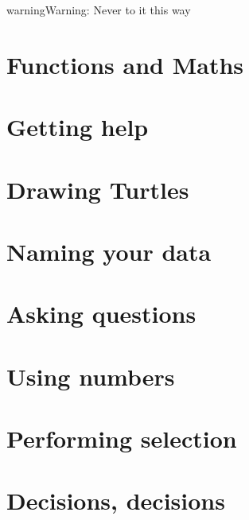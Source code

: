 \documentclass[letterpaper,10pt,english]{sphinxmanual}
\begin{document}
\begin{notice}{warning}{Warning:}
Never to it this way
\end{notice}


\chapter{Functions and Maths}
\label{2 - Functions and Maths:functions-and-maths}\label{2 - Functions and Maths::doc}

\chapter{Getting help}
\label{3 - Getting help:getting-help}\label{3 - Getting help::doc}

\chapter{Drawing Turtles}
\label{4 - Drawing Turtles:drawing-turtles}\label{4 - Drawing Turtles::doc}

\chapter{Naming your data}
\label{5 - Naming your data:naming-your-data}\label{5 - Naming your data::doc}

\chapter{Asking questions}
\label{6 - Asking questions::doc}\label{6 - Asking questions:asking-questions}

\chapter{Using numbers}
\label{7 - Using numbers::doc}\label{7 - Using numbers:using-numbers}

\chapter{Performing selection}
\label{8 - Performing selection:performing-selection}\label{8 - Performing selection::doc}

\chapter{Decisions, decisions}
\label{9 - Decisions, decisions:decisions-decisions}\label{9 - Decisions, decisions::doc}
\end{document}
